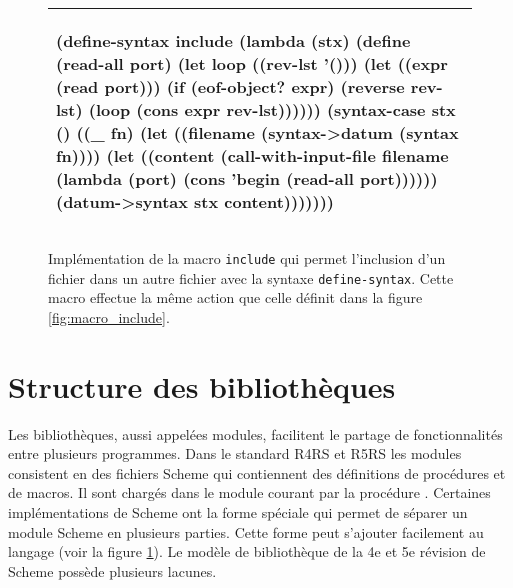 

\begin{figure}[ht]
\begin{tabular}{|l|}\hline
\begin{mplisting}{0.8}
(define-syntax include
  (lambda (stx)
    (define (read-all port)
      (let loop ((rev-lst '()))
        (let ((expr (read port)))
          (if (eof-object? expr)
            (reverse rev-lst)
            (loop (cons expr rev-lst))))))
    (syntax-case stx ()
      ((_ fn)
       (let ((filename (syntax->datum (syntax fn))))
         (let ((content
                 (call-with-input-file
                    filename
                    (lambda (port)
                      (cons 'begin (read-all port))))))
           (datum->syntax stx content)))))))
\end{mplisting}\\\hline

\end{tabular}
   \caption{Implémentation de la macro \texttt{include} qui permet l'inclusion
   d'un fichier dans un autre fichier avec la syntaxe \texttt{define-syntax}.
   Cette macro effectue la même action que celle définit dans la figure
   \ref{fig:macro_include}.}

   \label{fig:macro_include_def_syntax}
\end{figure}

\section{Structure des bibliothèques}

Les bibliothèques, aussi appelées modules, facilitent le partage de
fonctionnalités entre plusieurs programmes. Dans le standard
R4RS\cite{Scheme:R4RS} et R5RS\cite{Scheme:R5RS} les modules consistent en des
fichiers Scheme qui contiennent des définitions de procédures et de macros. Il
sont chargés dans le module courant par la procédure . Certaines
implémentations de Scheme ont la forme spéciale  qui permet de
séparer un module Scheme en plusieurs parties. Cette forme peut s'ajouter
facilement au langage (voir la figure \ref{fig:macro_include_def_syntax}).  Le
modèle de bibliothèque de la 4e et 5e révision de Scheme possède plusieurs
lacunes.


